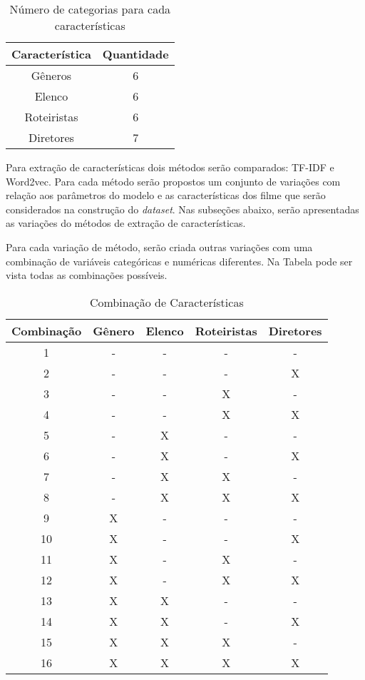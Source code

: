 \begin{table}[h]
\label{tab:n_categorias}
 \centering
\begin{tabular}{|c| c |}
\hline
Característica &  Quantidade \\ 
\hline
Gêneros & 6  \\
\hline
Elenco & 6  \\ 
\hline
Roteiristas & 6 \\ 
\hline
Diretores & 7 \\
\hline    
\end{tabular}
\caption{\label{tab:n_categorias}Número de categorias para cada características}
\end{table}

Para extração de características dois métodos serão comparados: TF-IDF e Word2vec. Para cada método serão propostos um conjunto de variações com relação aos parâmetros do modelo e as características dos filme que serão considerados  na construção do \textit{dataset}. Nas subseções abaixo, serão apresentadas as variações do métodos de extração de características. 

Para cada variação de método, serão criada outras variações com uma combinação de variáveis categóricas e numéricas diferentes. Na Tabela \label{tab:combinacoes} pode ser vista todas as combinações possíveis.

\begin{table}[H]
\label{tab:combinacoes}
\centering
\begin{tabular}{|c| c | c | c | c|}
\hline
Combinação &  Gênero  & Elenco & Roteiristas & Diretores  \\ 
\hline
1 & -  & - & - & - \\
\hline
2 & -  & - & - & X\\
\hline
3 & -  & - & X & - \\
\hline
4 & -  & - & X & X \\
\hline   
5 & -  & X & - & - \\
\hline   
6 & -  & X & - & X \\
\hline   
7 & -  & X & X & - \\
\hline   
8 & -  & X & X & X \\
\hline   
9 & X  & - & - & - \\
\hline   
10 & X  & - & - & X \\
\hline  
11 & X  & - & X & - \\
\hline  
12 & X  & - & X & X \\
\hline  
13 & X  & X & - & - \\
\hline  
14 & X  & X & - & X \\
\hline  
15 & X  & X & X & - \\
\hline  
16 & X  & X & X & X \\
\hline  

\end{tabular}
\caption{\label{tab:combinacoes}Combinação de Características}
\end{table}

